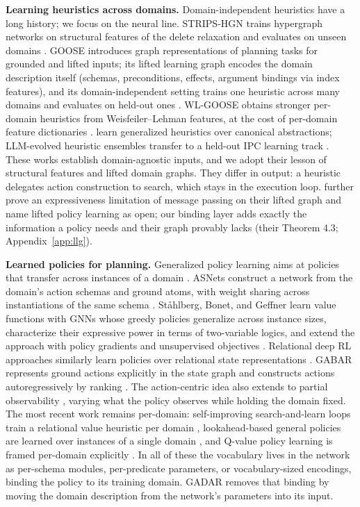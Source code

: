 \documentclass{article} %
\newcommand{\gadar}{GADAR}                 %
\begin{document}
\textbf{Learning heuristics across domains.} Domain-independent heuristics
have a long history; we focus on the neural line. STRIPS-HGN trains
hypergraph networks on structural features of the delete relaxation and
evaluates on unseen domains \citep{strips_hgn}. GOOSE introduces graph
representations of planning tasks for grounded and lifted inputs; its
lifted learning graph encodes the domain description itself (schemas,
preconditions, effects, argument bindings via index features), and its
domain-independent setting trains one heuristic across many domains and
evaluates on held-out ones \citep{goose_v1, goose_v2}. WL-GOOSE obtains
stronger per-domain heuristics from Weisfeiler--Lehman features, at the
cost of per-domain feature dictionaries \citep{wl_goose}.
\citet{karia2021learning} learn generalized heuristics over canonical
abstractions; LLM-evolved heuristic ensembles transfer to a held-out IPC
learning track \citep{llm_evolved_heuristics_2026}. These works establish
domain-agnostic inputs, and we adopt their lesson of structural features
and lifted domain graphs. They differ in output: a heuristic delegates
action construction to search, which stays in the execution loop.
\citet{goose_v2} further prove an expressiveness limitation of message
passing on their lifted graph and name lifted policy learning as open; our
binding layer adds exactly the information a policy needs and their graph
provably lacks (their Theorem 4.3; Appendix~\ref{app:llg}).

\textbf{Learned policies for planning.} Generalized policy learning aims at
policies that transfer across instances of a domain
\citep{approx_Policy_iter, relational_rl}. ASNets construct a network from
the domain's action schemas and ground atoms, with weight sharing across
instantiations of the same schema \citep{toyer2020asnets}. St{\aa}hlberg,
Bonet, and Geffner learn value functions with GNNs whose greedy policies
generalize across instance sizes, characterize their expressive power in
terms of two-variable logics, and extend the approach with policy gradients
and unsupervised objectives \citep{expressive_v1, unsupervised_gnn,
policy_gradients, policy_beyond_c2}. Relational deep RL approaches
similarly learn policies over relational state representations
\citep{relational_drl, sr_drl, relational_mdp_learning, rddl_gnn,
generalized_planning_deep_rl}. GABAR represents ground actions explicitly in the
state graph and constructs actions autoregressively by ranking
\citep{gabar}. The action-centric idea also extends to partial observability
\citep{gammazero, hoo_pomdp}, varying what the policy observes while
holding the domain fixed. The most recent work remains per-domain: self-improving
search-and-learn loops train a relational value heuristic per domain
\citep{learning_to_search_2026}, lookahead-based general policies are
learned over instances of a single domain
\citep{lookahead_policies_2026}, and Q-value policy learning is framed
per-domain explicitly \citep{mueller_qvalues}. In all of these the
vocabulary lives in the network as per-schema modules, per-predicate
parameters, or vocabulary-sized encodings, binding the policy to its
training domain. \gadar{} removes that binding by moving the domain
description from the network's parameters into its input.
\end{document}
